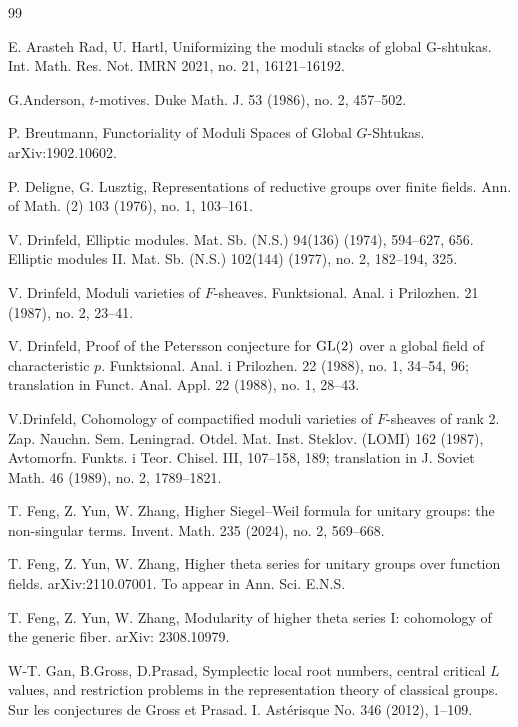 \documentclass[11pt]{amsart}
\numberwithin{equation}{section}
\theoremstyle{plain}
\theoremstyle{definition}
\newcommand\GL{\textup{GL}}
\begin{document}
\begin{thebibliography}{99}

E. Arasteh Rad, U. Hartl,
Uniformizing the moduli stacks of global G-shtukas.
Int. Math. Res. Not. IMRN 2021, no. 21, 16121--16192.

G.Anderson, 
$t$-motives.
Duke Math. J. 53 (1986), no. 2, 457--502.

P. Breutmann, 
Functoriality of Moduli Spaces of Global $G$-Shtukas. 
arXiv:1902.10602.

P. Deligne, G. Lusztig,
Representations of reductive groups over finite fields. 
Ann. of Math. (2) 103 (1976), no. 1, 103--161.


V. Drinfeld,
Elliptic modules. Mat. Sb. (N.S.) 94(136) (1974), 594--627, 656. Elliptic modules II. Mat. Sb. (N.S.) 102(144) (1977), no. 2, 182--194, 325.

V. Drinfeld,
Moduli varieties of $F$-sheaves. 
Funktsional. Anal. i Prilozhen. 21 (1987), no. 2, 23--41. 
 
V. Drinfeld, 
Proof of the Petersson conjecture for $\GL(2)$ over a global field of characteristic $p$. 
Funktsional. Anal. i Prilozhen. 22 (1988), no. 1, 34--54, 96; translation in Funct. Anal. Appl. 22 (1988), no. 1, 28--43.

V.Drinfeld, 
Cohomology of compactified moduli varieties of $F$-sheaves of rank 2.  
Zap. Nauchn. Sem. Leningrad. Otdel. Mat. Inst. Steklov. (LOMI) 162 (1987), Avtomorfn. Funkts. i Teor. Chisel. III, 107--158, 189; translation in J. Soviet Math. 46 (1989), no. 2, 1789--1821.

T. Feng, Z. Yun, W. Zhang,
Higher Siegel--Weil formula for unitary groups: the non-singular terms.
Invent. Math. 235 (2024), no. 2, 569--668.

T. Feng, Z. Yun, W. Zhang,
Higher theta series for unitary groups over function fields.
arXiv:2110.07001. To appear in Ann. Sci. E.N.S.


T. Feng, Z. Yun, W. Zhang,
Modularity of higher theta series I: cohomology of the generic fiber.
arXiv: 2308.10979.

W-T. Gan, B.Gross, D.Prasad,
Symplectic local root numbers, central critical $L$ values, and restriction problems in the representation theory of classical groups. 
Sur les conjectures de Gross et Prasad. I. Ast\'erisque No. 346 (2012), 1--109.



\end{thebibliography}
\end{document}
